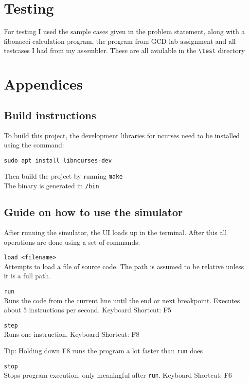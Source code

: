 \documentclass[12pt]{article}
\begin{document}
	\section{Testing}

	For testing I used the sample cases given in the problem statement, along with a fibonacci calculation program, the program from GCD lab assignment and all testcases I had from my assembler. These are all available in the \verb|\test| directory

	\newpage
	\appendix
	\section{Appendices}
	
	\subsection{Build instructions}

	To build this project, the development libraries for ncurses need to be installed using the command:

	\verb|sudo apt install libncurses-dev|	

	Then build the project by running \verb|make|\\
	The binary is generated in \verb|/bin|

	\subsection{Guide on how to use the simulator}

	After running the simulator, the UI loads up in the terminal. After this all operations are done using a set of commands:

	\verb|load <filename>|\\
	Attempts to load a file of source code. The path is assumed to be relative unless it is a full path.
	
	\verb|run|\\
	Runs the code from the current line until the end or next breakpoint. Executes about 5 instructions per second. Keyboard Shortcut: F5

	\verb|step|\\
	Runs one instruction, Keyboard Shortcut: F8

	Tip: Holding down F8 runs the program a lot faster than \verb|run| does

	\verb|stop|\\
	Stops program execution, only meaningful after \verb|run|. Keyboard Shortcut: F6
\end{document}
